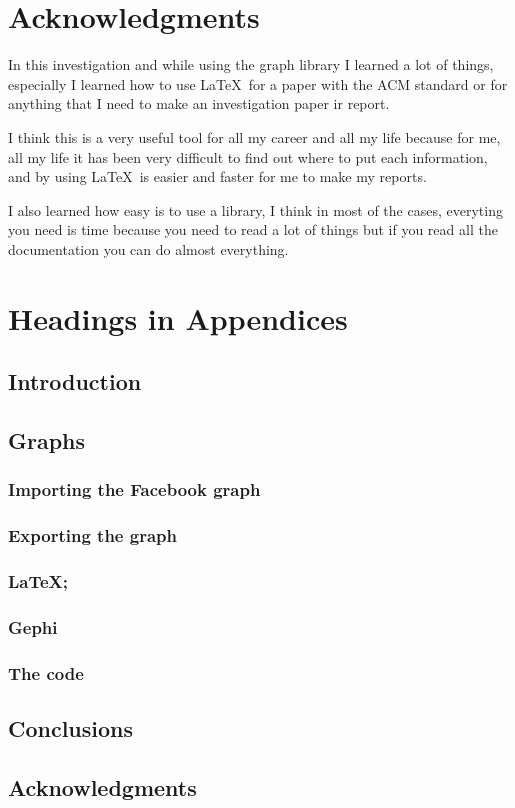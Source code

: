 \documentclass{sig-alternate-05-2015}
\begin{document}
\section{Acknowledgments}
In this investigation and while using the graph library
I learned a lot of things, especially I learned how to use
\LaTeX\ for a paper with the ACM standard or for anything that I
need to make an investigation paper ir report.

I think this is a very useful tool for all my career and all my life
because for me, all my life it has been very difficult to find out where
to put each information, and by using \LaTeX\ is easier and
faster for me to make my reports.

I also learned how easy is to use a library, I think in most of the
cases, everyting you need is time because you need to read a lot
of things but if you read all the documentation you can
do almost everything.

%

%
%
\appendix
\section{Headings in Appendices}
\subsection{Introduction}
\subsection{Graphs}
\subsubsection{Importing the Facebook graph}
\subsubsection{Exporting the graph}
\subsubsection{\LaTeX;}
\subsubsection{Gephi}
\subsubsection{The code}
\subsection{Conclusions}
\subsection{Acknowledgments}
\end{document}
